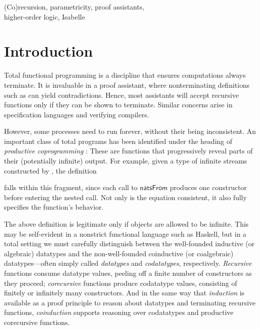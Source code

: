 \documentclass[preprint,draft]
{sigplanconf}
\newcommand\TC{\mathsf}
\newcommand{\<}{\langle}
\renewcommand{\>}{\rangle}
\newcommand\const[1]{{\ensuremath{\TC{#1}}}}
\begin{document}
{\raggedright \keywords
(Co)recursion,
parametricity,
proof assistants, \\
higher-order logic,
Isabelle
}



















\section{Introduction}
\label{sec-intro}

Total functional programming is a discipline that ensures computations
always terminate. It is invaluable in a proof assistant, where nonterminating
definitions such as  can yield
contradictions. Hence, most assistants will accept recursive functions
only if they can be shown to terminate. Similar concerns arise in specification
languages and verifying compilers.


However, some processes need to run forever, without their being inconsistent.
An important class of total programs has been identified under the heading of
\emph{productive coprogramming}
\cite{turner-1995,abbott-et-al-2005,mcbride-productive}: These
are functions that progressively reveal parts of their (potentially infinite)
output. For example, given a type of infinite streams constructed by ,
the definition

falls within this fragment, since each call to \const{natsFrom} produces one
constructor before entering the nested call. Not only is the equation
consistent, it also fully specifies the function's behavior.

The above definition is legitimate only if objects are allowed to be infinite.
This may be self-evident in a nonstrict functional language such as Haskell, but
in a total setting we must carefully distinguish between the well-founded
inductive (or algebraic) datatypes and the non-well-founded
coinductive (or coalgebraic) datatypes---often simply called
\emph{datatypes} and \emph{codatatypes}, respectively.
\emph{Recursive} functions consume datatype values, peeling off a finite number
of constructors as they proceed; \emph{co\-recursive} functions produce
codatatype values, consisting of finitely or infinitely many constructors. And
in the same
way that \emph{induction} is available as a proof principle to reason about
datatypes and terminating recursive functions, \emph{coinduction}
supports reasoning over codatatypes and productive corecursive functions.
\end{document}
